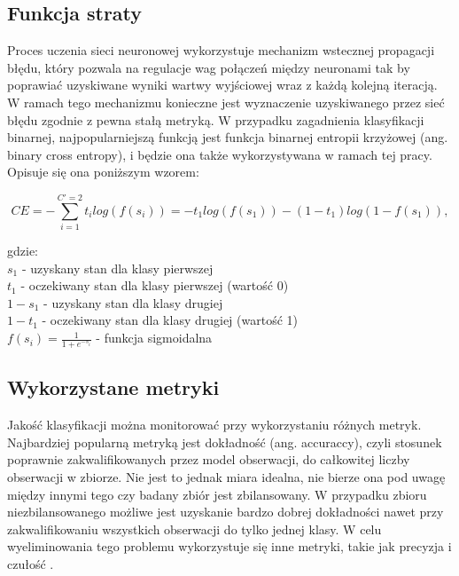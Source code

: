 


\subsection{Funkcja straty}

Proces uczenia sieci neuronowej wykorzystuje mechanizm wstecznej propagacji błędu, który pozwala na regulacje wag połączeń między neuronami tak by poprawiać uzyskiwane wyniki wartwy wyjściowej wraz z każdą kolejną iteracją. W ramach tego mechanizmu konieczne jest wyznaczenie uzyskiwanego przez sieć błędu zgodnie z pewna stałą metryką. W przypadku zagadnienia klasyfikacji binarnej, najpopularniejszą funkcją jest funkcja binarnej entropii krzyżowej (ang. binary cross entropy), i będzie ona także wykorzystywana w ramach tej pracy. Opisuje się ona poniższym wzorem: 

$$
CE = -\sum_{i=1}^{C'=2}t_{i} log (f(s_{i})) = -t_{1} log(f(s_{1})) - (1 - t_{1}) log(1 - f(s_{1})),
$$


\noindent gdzie: \\
$s_1$ - uzyskany stan dla klasy pierwszej \\
$t_1$ - oczekiwany stan dla klasy pierwszej (wartość 0)\\
$1-s_1$ - uzyskany stan dla klasy drugiej \\
$1-t_1$ - oczekiwany stan dla klasy drugiej (wartość 1) \\
$f(s_i)=\frac{1}{1+e^{-s_i}}$ - funkcja sigmoidalna



\subsection{Wykorzystane metryki}

Jakość klasyfikacji można monitorować przy wykorzystaniu różnych metryk. Najbardziej popularną metryką jest dokładność (ang. accuraccy), czyli stosunek poprawnie zakwalifikowanych przez model obserwacji, do całkowitej liczby obserwacji w zbiorze. Nie jest to jednak miara idealna, nie bierze ona pod uwagę między innymi tego czy badany zbiór jest zbilansowany. W przypadku zbioru niezbilansowanego możliwe jest uzyskanie bardzo dobrej dokładności nawet przy zakwalifikowaniu wszystkich obserwacji do tylko jednej klasy. W celu wyeliminowania tego problemu wykorzystuje się inne metryki, takie jak precyzja i czułość \cite{metryki_3}.



